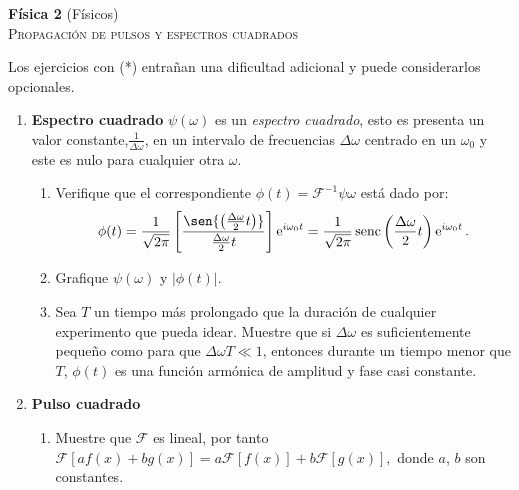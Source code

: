 \documentclass[11pt,spanish,a4paper]{article}
\begin{document}
\begin{center}
\textbf{Física 2} (Físicos) \hfill {}\\
	\textsc{\LARGE Propagación de pulsos y espectros cuadrados}
\end{center}

Los ejercicios con (*) entrañan una dificultad adicional y puede considerarlos opcionales.



\begin{enumerate}


\item
\textbf{Espectro cuadrado}
\(\psi(\omega)\) es un \emph{espectro cuadrado}, esto es presenta un valor constante,$\frac{1}{\Delta \omega}$, en un intervalo de frecuencias $\Delta\omega$ centrado en un $\omega_0$ y este es nulo para cualquier otra $\omega$.
\begin{enumerate}
	\item
	Verifique que el correspondiente $\phi(t) = \mathcal{F}^{-1} \psi{\omega}$ está dado por:
	$$
		\phi(t)
		= \frac{1}{\sqrt{2 \pi}} \left[ \frac{ \sen{ \left( \frac{\Delta \omega}{2} t \right) } }{\frac{\Delta \omega}{2} t} \right] \operatorname{e}^{i \omega_0 t}
		= \frac{1}{\sqrt{2 \pi}} \operatorname{senc} \left( \frac{\Delta \omega}{2} t \right) \operatorname{e}^{i \omega_0 t}.
	$$
	\item
	Grafique $\psi(\omega)$ y $\left|\phi(t)\right|$.
	\item 
	Sea $T$ un tiempo más prolongado que la duración de cualquier experimento que pueda idear.
	Muestre que si $\Delta\omega$ es suficientemente pequeño como para que $\Delta\omega T\ll1$, entonces durante un tiempo menor que $T$, $\phi(t)$ es una función armónica de amplitud y fase casi constante.
\end{enumerate}


\item \textbf{Pulso cuadrado}
\begin{enumerate}
	\item Muestre que $\mathcal{F}$ es lineal, por tanto
	$
	\mathcal{F} \left[ a f(x) + b g(x) \right] = a \mathcal{F} \left[ f(x) \right] + b \mathcal{F} \left[ g(x) \right],
	$
	donde $a$, $b$ son constantes.


\end{enumerate}
\end{enumerate}
\end{document}
